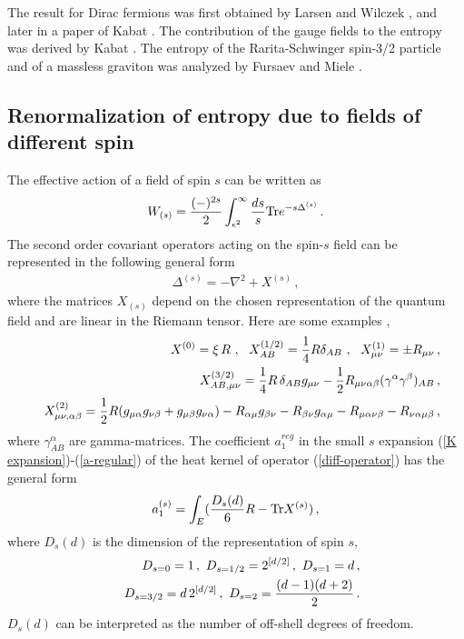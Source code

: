 \documentclass[12pt]{article}
\def\tr{\hbox{Tr}}
\def\be{\begin{eqnarray}}
\def\ee{\end{eqnarray}}
\def\lb{\label}
\def\o{\over}
\begin{document}
The result for  Dirac fermions was first obtained by Larsen and Wilczek \cite{Larsen:1994yt}, \cite{Larsen:1995ax} and later in a paper of Kabat \cite{Kabat:1995eq}.
The contribution of the gauge fields to the entropy was derived  by Kabat \cite{Kabat:1995eq}. The entropy of the Rarita-Schwinger spin-3/2 particle
and of a  massless graviton was analyzed by Fursaev and Miele  \cite{Fursaev:1996uz}. 


\subsection{Renormalization of entropy due to fields of different spin}
The effective action of a field of spin $s$ can be written as  
\be
W_{(s)}={(-)^{2s}\o 2}\int^\infty_{\epsilon^2}{ds\o s}\tr e^{-s\Delta^{(s)}}\, .
\lb{effective action spin s}
\ee
The second order covariant operators acting on  the spin-$s$ field can be represented in the following general form
\be
\Delta^{(s)}=-\nabla^2 +X^{(s)}\, ,
\lb{diff-operator}
\ee
where  the matrices $X_{(s)}$ depend on the chosen representation of the quantum field and are  linear in the Riemann tensor.
Here are some examples \cite{Christensen:1978md}, \cite{Christensen:1979iy}
\be
&&X^{(0)}=\xi\, R~,~~X^{(1/2)}_{AB}={1\o 4}R\delta_{AB}~,~~X^{(1)}_{\mu\nu}=\pm R_{\mu\nu}\, ,\nonumber \\
&&X^{(3/2)}_{AB,\mu\nu}={1\o 4}R\,\delta_{AB}g_{\mu\nu}-{1\o 2}R_{\mu\nu\alpha\beta}(\gamma^\alpha\gamma^\beta)_{AB}\, ,\nonumber \\
&&X^{(2)}_{\mu\nu ,\alpha\beta}={1\o 2} R(g_{\mu\alpha}g_{\nu\beta}+g_{\mu\beta}g_{\nu\alpha})-R_{\alpha\mu}g_{\beta\nu}-R_{\beta\nu}g_{\alpha\mu}-R_{\mu\alpha\nu \beta}-R_{\nu\alpha\mu\beta}\, ,
\lb{matrices X}
\ee
where $\gamma^\alpha_{AB}$ are gamma-matrices. 
The coefficient $a^{reg}_1$ in the small $s$ expansion (\ref{K expansion})-(\ref{a-regular}) of the heat kernel of operator (\ref{diff-operator}) has the general form
\be
a_1^{(s)}=\int_E({{D}_s(d)\o 6}R-\tr X^{(s)})\, ,
\lb{a2-general spin}
\ee
where $D_s(d)$ is the dimension of the representation of spin $s$,
\be
&&D_{s=0}=1\, , \,\, D_{s=1/2}=2^{[d/2]}\, ,\,\, D_{s=1}=d\, , \nonumber\\
&&D_{s=3/2}= d\, 2^{[d/2]}\, , \,\, D_{s=2}={(d-1)(d+2)\over 2}\, .
\lb{dimensions representation}
\ee
$D_s(d)$ can be interpreted as the number of off-shell degrees of freedom.
\end{document}

